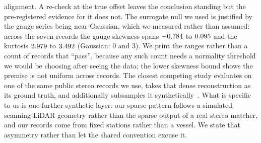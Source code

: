 \documentclass[review]{elsarticle}
\begin{document}
alignment. A re-check at the true offset leaves the conclusion standing but the
pre-registered evidence for it does not. The surrogate null we used is justified by the
gauge series being near-Gaussian, which we measured rather than assumed: across the
seven records the gauge skewness spans $-0.784$ to $0.095$ and the
kurtosis $2.979$ to $3.492$ (Gaussian: $0$ and $3$). We print the
ranges rather than a count of records that ``pass'', because any such count needs a
normality threshold we would be choosing after seeing the data; the lower skewness
bound shows the premise is not uniform across records.
The closest competing study evaluates on one of the same public stereo records we use,
takes that dense reconstruction as its ground truth, and additionally subsamples it
synthetically~\citep{Wang2025PointsToWaves}. What is specific to us is one further
synthetic layer: our sparse pattern follows a simulated scanning-LiDAR geometry rather
than the sparse output of a real stereo matcher, and our records come from fixed stations
rather than a vessel. We state that asymmetry rather than let the shared convention
excuse it.
\end{document}
